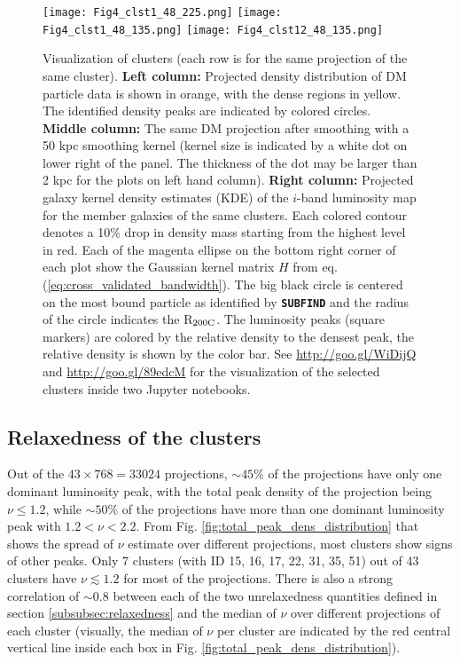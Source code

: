 \begin{figure*}
	\begin{center}
	\texttt{[image: Fig4\_clst1\_48\_225.png]}
	\texttt{[image: Fig4\_clst1\_48\_135.png]}
	\texttt{[image: Fig4\_clst12\_48\_135.png]}
	\caption{	Visualization of clusters (each row is for the same projection
		of the same cluster). {\bf Left column:} Projected density distribution of DM	
		particle data is shown in orange, with the dense regions in yellow. 
		The identified density peaks are indicated by colored circles. 
		{\bf Middle column:} The same DM projection after smoothing with a 50 
		kpc smoothing kernel (kernel size is indicated by a white dot on lower right of
		the panel. The thickness of the dot may be larger than 2 kpc
		for the plots on left hand column).
		{\bf Right column:} Projected galaxy kernel density estimates (KDE) of 
		the $i$-band luminosity map for the member
		galaxies of the same clusters. Each colored contour denotes a 10\% drop 
		in density mass starting from the highest level in red. Each of 
		the magenta ellipse on the
		bottom right corner of each plot show the Gaussian kernel matrix 
		$H$ from eq. (\ref{eq:cross_validated_bandwidth}). 
		The big black 
		circle is centered on the most bound particle as identified by {\bf
		\texttt{SUBFIND}} and the radius of the circle indicates the 
		R$_{\rm 200C}$. The luminosity peaks (square markers) are colored
		by the relative density to the densest peak, the relative density  
		is shown by the color bar.  
		See \href{http://goo.gl/WiDijQ}{http://goo.gl/WiDijQ} 
		and \href{http://goo.gl/89edcM}{http://goo.gl/89edcM} for the 
		visualization of the selected clusters inside two Jupyter notebooks.
		\label{fig:select_peak_visualization}
	}
\end{center}
\end{figure*}

\subsection{Relaxedness of the clusters}
Out of the $43 \times 768 = 33 024$ projections, $\sim 45\%$ of the projections 
have only one dominant luminosity peak, with the total peak density of the
projection being $\nu \leq 1.2$, 
while $\sim 50\%$ of the projections have more than one dominant luminosity
peak with $1.2 < \nu < 2.2$. 
From Fig. \ref{fig:total_peak_dens_distribution} that shows the spread of $\nu$
estimate over different projections, 
most clusters show signs of other peaks.
Only 7 clusters (with ID 15, 16, 17, 22, 31, 35, 51) out of 43 clusters have $\nu
\lesssim 1.2$ for most of the projections.
There is also a strong correlation of $\sim 0.8$ 
between each of the two unrelaxedness quantities defined in section 
\ref{subsubsec:relaxedness}
and the median of $\nu$ over different projections of each cluster (visually,
the median of $\nu$ per cluster are indicated by the red central vertical line
inside each box in Fig. 
\ref{fig:total_peak_dens_distribution}).


